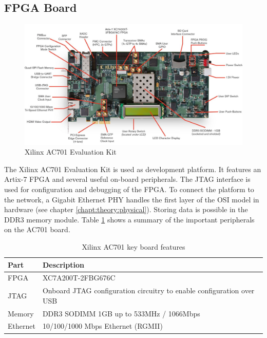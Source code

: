 \subsection{FPGA Board} \label{chapt:mission:fpgaboard}
\begin{figure}[tb!]
    \centering
    \includegraphics[width=\textwidth]{images/mission/ac701.png}
    \caption{Xilinx AC701 Evaluation Kit \cite{image_ac701}}
    \label{fig:ac701}
\end{figure}

The Xilinx AC701 Evaluation Kit is used as development platform. It features an
Artix-7 FPGA and several useful on-board peripherals. The JTAG interface is used
for configuration and debugging of the FPGA. To connect the platform to the
network, a Gigabit Ethernet PHY handles the first layer of the OSI model in
hardware (see chapter \ref{chapt:theory:physical}). Storing data is possible in the DDR3 memory
module. Table \ref{tab:ac701} shows a summary of the important peripherals on
the AC701 board.
\\
\begin{table}[b!]
    \centering
    \begin{tabular}{l l}
        \toprule
        Part & Description \\
        \midrule
        FPGA & XC7A200T-2FBG676C \\
        JTAG & Onboard JTAG configuration circuitry to enable configuration over USB \\
        Memory & DDR3 SODIMM 1GB up to 533MHz / 1066Mbps \\
        Ethernet & 10/100/1000 Mbps Ethernet (RGMII) \\
        \bottomrule
    \end{tabular}
    \caption{Xilinx AC701 key board features \cite{xilinx_ac701}}
    \label{tab:ac701}
\end{table}

